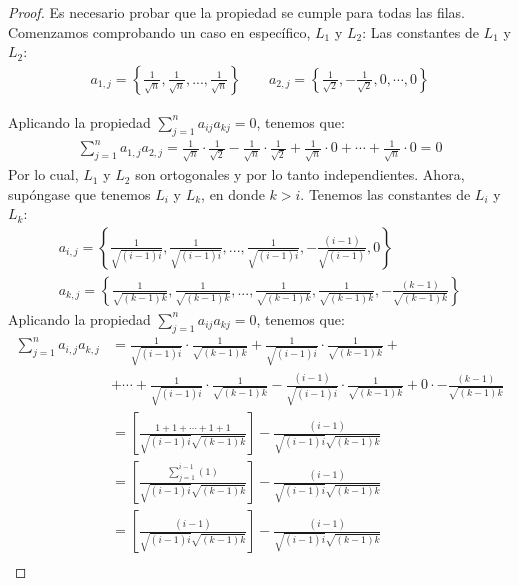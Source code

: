 \documentclass[a4paper,12pt]{article}
\begin{document}
\begin{enumerate}
\begin{proof}
Es necesario probar que la propiedad se cumple para todas las filas. Comenzamos comprobando un caso en específico, $L_1$ y $L_2$:\newline\newline 
Las constantes de $L_1$ y $L_2$:
\begin{gather*}
    a_{1,j} = \left\{\frac{1}{\sqrt{n}},\frac{1}{\sqrt{n}},...,\frac{1}{\sqrt{n}}\right\}
\qquad a_{2,j} = \left\{\frac{1}{\sqrt{2}},-\frac{1}{\sqrt{2}},0,\cdots,0\right\}
\end{gather*}

Aplicando la propiedad $\sum_{j=1}^n a_{ij}a_{kj}=0$, tenemos que:
\begin{gather*}
    \sum_{j=1}^n a_{1,j}a_{2,j}= \frac{1}{\sqrt{n}}\cdot \frac{1}{\sqrt{2}}-\frac{1}{\sqrt{n}}\cdot \frac{1}{\sqrt{2}}+\frac{1}{\sqrt{n}}\cdot 0+\cdots + \frac{1}{\sqrt{n}}\cdot 0 = 0
\end{gather*}
Por lo cual, $L_1$ y $L_2$ son ortogonales y por lo tanto independientes.\newline\newline
Ahora, supóngase que tenemos $L_i$ y $L_k$, en donde $k>i$. Tenemos las constantes de $L_i$ y $L_k$: 
\begin{gather*}
    a_{i,j} = \left\{\frac{1}{\sqrt{(i-1)i}}, \frac{1}{\sqrt{(i-1)i}},...,\frac{1}{\sqrt{(i-1)i}}, -\frac{(i-1)}{\sqrt{(i-1)}},0\right\}\\
    a_{k,j} = \left\{\frac{1}{\sqrt{(k-1)k}}, \frac{1}{\sqrt{(k-1)k}},...,\frac{1}{\sqrt{(k-1)k}},\frac{1}{\sqrt{(k-1)k}}, -\frac{(k-1)}{\sqrt{(k-1)k}}\right\}
\end{gather*}
Aplicando la propiedad $\sum_{j=1}^n a_{ij}a_{kj}=0$, tenemos que:
\begin{align*}
    \sum_{j=1}^n a_{i,j}a_{k,j}&=\frac{1}{\sqrt{(i-1)i}}\cdot \frac{1}{\sqrt{(k-1)k}} + \frac{1}{\sqrt{(i-1)i}}\cdot \frac{1}{\sqrt{(k-1)k}}+\\
    &+ \cdots + \frac{1}{\sqrt{(i-1)i}}\cdot \frac{1}{\sqrt{(k-1)k}} -
    \frac{(i-1)}{\sqrt{(i-1)i}}\cdot \frac{1}{\sqrt{(k-1)k}}+0\cdot -\frac{(k-1)}{\sqrt{(k-1)k}}\\
    &= \left[\frac{1+1+\cdots + 1+1 }{\sqrt{(i-1)i}\sqrt{(k-1)k}}\right] -\frac{(i-1)}{\sqrt{(i-1)i}\sqrt{(k-1)k}}\\
    &= \left[\frac{\sum_{j=1}^{i-1}(1) }{\sqrt{(i-1)i}\sqrt{(k-1)k}}\right] -\frac{(i-1)}{\sqrt{(i-1)i}\sqrt{(k-1)k}}\\
    &= \left[\frac{(i-1)}{\sqrt{(i-1)i}\sqrt{(k-1)k}}\right] -\frac{(i-1)}{\sqrt{(i-1)i}\sqrt{(k-1)k}}\\

\end{align*}
\end{proof}
\end{enumerate}
\end{document}
